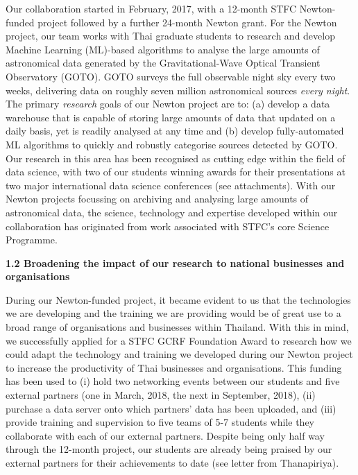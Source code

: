 \documentclass[11pt]{article}
\begin{document}
  \vspace{2mm}
  \noindent
  Our collaboration started in February, 2017, with a 12-month STFC Newton-funded project followed by a further 24-month Newton grant. For the Newton project, our team works with Thai graduate students to research and develop Machine Learning (ML)-based algorithms to analyse the large amounts of astronomical data generated by the Gravitational-Wave Optical Transient Observatory (GOTO). GOTO surveys the full observable night sky every two weeks, delivering data on roughly seven million astronomical sources {\it every night}. The primary {\it research} goals of our Newton project are to: (a) develop a data warehouse that is capable of storing large amounts of data that updated on a daily basis, yet is readily analysed at any time and (b) develop fully-automated ML algorithms to quickly and robustly categorise sources detected by GOTO. Our research in this area has been recognised as cutting edge within the field of data science, with two of our students winning awards for their presentations at two major international data science conferences (see attachments). With our Newton projects focussing on archiving and analysing large amounts of astronomical data, the science, technology and expertise developed within our collaboration has originated from work associated with STFC's core Science Programme. 
  
  \vspace{3mm}
  \noindent
  {\large \bf 1.2 Broadening the impact of our research to national businesses and organisations}
  
  \noindent
  During our Newton-funded project, it became evident to us that the technologies we are developing and the training we are providing would be of great use to a broad range of organisations and businesses within Thailand. With this in mind, we successfully applied for a STFC GCRF Foundation Award to research how we could adapt the technology and training we developed during our Newton project to increase the productivity of Thai businesses and organisations. This funding has been used to (i) hold two networking events between our students and five external partners (one in March, 2018, the next in September, 2018), (ii) purchase a data server onto which partners' data has been uploaded, and (iii) provide training and supervision to five teams of 5-7 students while they collaborate with each of our external partners. Despite being only half way through the 12-month project, our students are already being praised by our external partners for their achievements to date (see letter from Thanapiriya).
  
\end{document}
